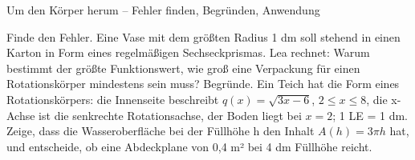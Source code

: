 \begin{aufgabe}{Um den Körper herum – Fehler finden, Begründen, Anwendung}
\begin{teile}
\teil Finde den Fehler. Eine Vase mit dem größten Radius 1 dm soll stehend in einen Karton in Form eines regelmäßigen Sechseckprismas. Lea rechnet: 
\teil Warum bestimmt der größte Funktionswert, wie groß eine Verpackung für einen Rotationskörper mindestens sein muss? Begründe.
\teil Ein Teich hat die Form eines Rotationskörpers: die Innenseite beschreibt $q(x) = \sqrt{3x - 6}$, $2 \le x \le 8$, die x-Achse ist die senkrechte Rotationsachse, der Boden liegt bei $x = 2$; 1 LE = 1 dm. Zeige, dass die Wasseroberfläche bei der Füllhöhe h den Inhalt $A(h) = 3\pi h$ hat, und entscheide, ob eine Abdeckplane von 0,4 m² bei 4 dm Füllhöhe reicht. \janein
\end{teile}
\end{aufgabe}
